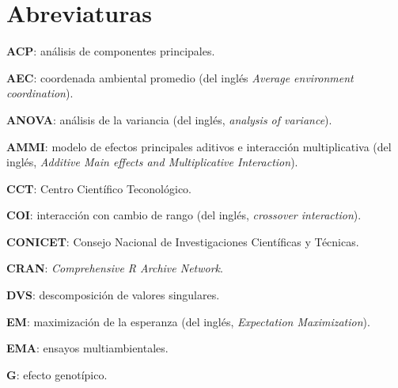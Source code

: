 

\chapter*{Abreviaturas}
\begin{description}
\item{\textbf{ACP}}: análisis de componentes principales.

\item{\textbf{AEC}}: coordenada ambiental promedio (del inglés \emph{Average environment coordination}).

\item{\textbf{ANOVA}}: análisis de la variancia (del inglés, \emph{analysis of variance}).

\item{\textbf{AMMI}}: modelo de efectos principales aditivos e interacción multiplicativa (del inglés, \emph{Additive Main effects and Multiplicative Interaction}).

\item{\textbf{CCT}}: Centro Científico Teconológico.

\item{\textbf{COI}}: interacción con cambio de rango (del inglés, \emph{crossover interaction}).

\item{\textbf{CONICET}}: Consejo Nacional de Investigaciones Científicas y Técnicas.

\item{\textbf{CRAN}}: \emph{Comprehensive R Archive Network}.

\item{\textbf{DVS}}: descomposición de valores singulares.

\item{\textbf{EM}}: maximización de la esperanza (del inglés, \emph{Expectation Maximization}).

\item{\textbf{EMA}}: ensayos multiambientales.

\item{\textbf{G}}: efecto genotípico.


\end{description}
